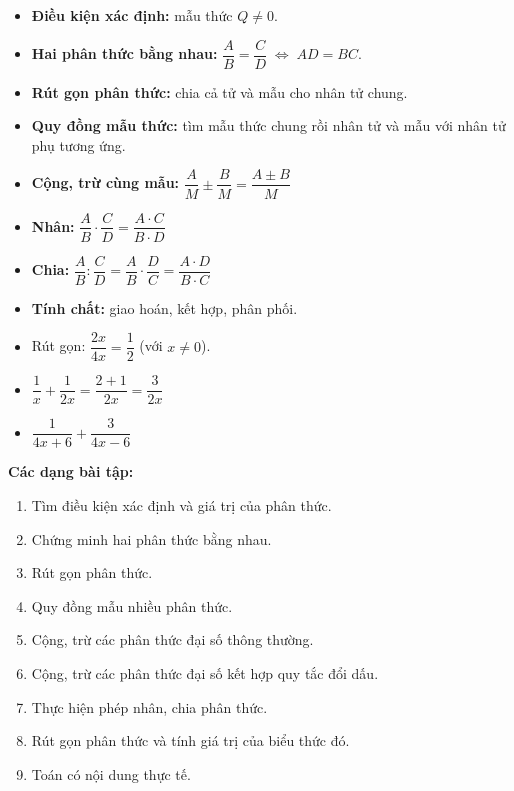 \documentclass[12pt,a4paper]{article}
\begin{document}
\begin{tinhchat}
  \begin{itemize}
    \item \textbf{Điều kiện xác định:} mẫu thức $Q \ne 0$.
    \item \textbf{Hai phân thức bằng nhau:}
      $\dfrac{A}{B} = \dfrac{C}{D} \;\Leftrightarrow\; AD = BC$.
    \item \textbf{Rút gọn phân thức:} chia cả tử và mẫu cho nhân tử chung.
    \item \textbf{Quy đồng mẫu thức:} tìm mẫu thức chung rồi nhân tử và mẫu với nhân tử phụ tương ứng.
  \end{itemize}
\end{tinhchat}

\begin{congthuc}[title={Các phép tính trên phân thức}]
  \begin{itemize}
    \item \textbf{Cộng, trừ cùng mẫu:}
      $\dfrac{A}{M} \pm \dfrac{B}{M} = \dfrac{A \pm B}{M}$
    \item \textbf{Nhân:}
      $\dfrac{A}{B} \cdot \dfrac{C}{D} = \dfrac{A \cdot C}{B \cdot D}$
    \item \textbf{Chia:}
      $\dfrac{A}{B} : \dfrac{C}{D} = \dfrac{A}{B} \cdot \dfrac{D}{C} = \dfrac{A \cdot D}{B \cdot C}$
    \item \textbf{Tính chất:} giao hoán, kết hợp, phân phối.
  \end{itemize}
\end{congthuc}

\begin{vidu}
  \begin{itemize}
    \item Rút gọn: $\dfrac{2x}{4x} = \dfrac{1}{2}$ \;(với $x \ne 0$).
    \item $\dfrac{1}{x} + \dfrac{1}{2x} = \dfrac{2 + 1}{2x} = \dfrac{3}{2x}$
    \item $\dfrac{1}{4x + 6} + \dfrac{3}{4x - 6}$
  \end{itemize}
\end{vidu}

\medskip\noindent\textbf{Các dạng bài tập:}
\begin{enumerate}[label=\textbf{Dạng \arabic*:}, leftmargin=*, align=left]
  \item Tìm điều kiện xác định và giá trị của phân thức.
  \item Chứng minh hai phân thức bằng nhau.
  \item Rút gọn phân thức.
  \item Quy đồng mẫu nhiều phân thức.
  \item Cộng, trừ các phân thức đại số thông thường.
  \item Cộng, trừ các phân thức đại số kết hợp quy tắc đổi dấu.
  \item Thực hiện phép nhân, chia phân thức.
  \item Rút gọn phân thức và tính giá trị của biểu thức đó.
  \item Toán có nội dung thực tế.
\end{enumerate}
\end{document}
